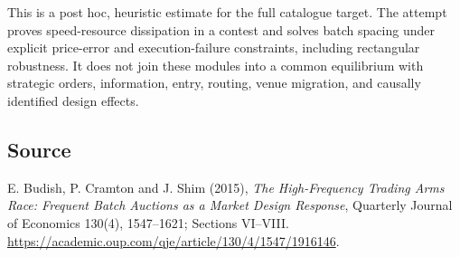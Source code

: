 \documentclass[11pt]{article}
\begin{document}
This is a post hoc, heuristic estimate for the full catalogue target.
The attempt proves speed-resource dissipation in a contest and solves batch spacing under explicit price-error and execution-failure constraints, including rectangular robustness. It does not join these modules into a common equilibrium with strategic orders, information, entry, routing, venue migration, and causally identified design effects.

\subsection*{Source}
E. Budish, P. Cramton and J. Shim (2015), \emph{The High-Frequency Trading
Arms Race: Frequent Batch Auctions as a Market Design Response},
Quarterly Journal of Economics 130(4), 1547--1621; Sections VI--VIII.
\url{https://academic.oup.com/qje/article/130/4/1547/1916146}.
\end{document}
